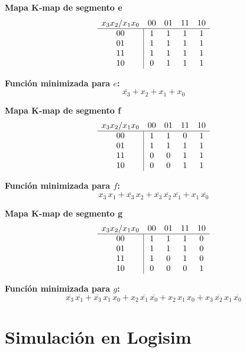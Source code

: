 \documentclass[12pt]{article}
\begin{document}
\noindent
\textbf{Mapa K‐map de segmento \textsf{e}}  
\[
\begin{array}{c|cccc}
\multicolumn{1}{c}{x_3x_2 / x_1x_0} & 00 & 01 & 11 & 10 \\
\hline
00 & 1 & 1 & 1 & 1 \\
01 & 1 & 1 & 1 & 1 \\
11 & 1 & 1 & 1 & 1 \\
10 & 0 & 1 & 1 & 1 \\
\end{array}
\]
\vspace{1em}

\noindent
\textbf{Función minimizada para \(e\):}
\[
\overline{x_3} + x_2 + x_1 + x_0
\]

\noindent
\textbf{Mapa K‐map de segmento \textsf{f}}  
\[
\begin{array}{c|cccc}
\multicolumn{1}{c}{x_3x_2 / x_1x_0} & 00 & 01 & 11 & 10 \\
\hline
00 & 1 & 1 & 0 & 1 \\
01 & 1 & 1 & 1 & 1 \\
11 & 0 & 0 & 1 & 1 \\
10 & 0 & 0 & 1 & 1 \\
\end{array}
\]
\vspace{1em}

\noindent
\textbf{Función minimizada para \(f\):}
\[
x_3\,x_1 + \overline{x_3}\,x_2 + \overline{x_3}\,\overline{x_2}\,\overline{x_1} + x_1\,\overline{x_0}
\]

\noindent
\textbf{Mapa K‐map de segmento \textsf{g}}  
\[
\begin{array}{c|cccc}
\multicolumn{1}{c}{x_3x_2 / x_1x_0} & 00 & 01 & 11 & 10 \\
\hline
00 & 1 & 1 & 1 & 0 \\
01 & 1 & 1 & 1 & 0 \\
11 & 1 & 0 & 1 & 0 \\
10 & 0 & 0 & 0 & 1 \\
\end{array}
\]
\vspace{1em}

\noindent
\textbf{Función minimizada para \(g\):}
\[
\overline{x_3}\,\overline{x_1} + \overline{x_3}\,x_1\,x_0 + x_2\,\overline{x_1}\,\overline{x_0} + x_2\,x_1\,x_0 + x_3\,\overline{x_2}\,x_1\,\overline{x_0}
\]

\section{Simulación en Logisim}
\end{document}
